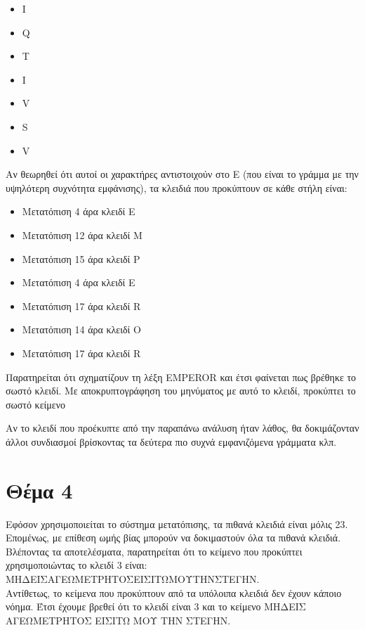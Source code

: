 \documentclass[a4paper, 11pt]{article}
\newcommand{\lt}{\latintext}
\begin{document}
{\lt
\begin{itemize}
	\item I
	\item Q
	\item T
	\item I
	\item V
	\item S
	\item V
\end{itemize}
}

Αν θεωρηθεί ότι αυτοί οι χαρακτήρες αντιστοιχούν στο {\lt E} (που είναι το γράμμα με την υψηλότερη συχνότητα εμφάνισης), τα
κλειδιά που προκύπτουν σε κάθε στήλη είναι:

\begin{itemize}
	\item Μετατόπιση 4 άρα κλειδί {\lt E}
	\item Μετατόπιση 12 άρα κλειδί {\lt M}
	\item Μετατόπιση 15 άρα κλειδί {\lt P}
	\item Μετατόπιση 4 άρα κλειδί {\lt E}
	\item Μετατόπιση 17 άρα κλειδί {\lt R}
	\item Μετατόπιση 14 άρα κλειδί {\lt O}
	\item Μετατόπιση 17 άρα κλειδί {\lt R}
\end{itemize}

Παρατηρείται ότι σχηματίζουν τη λέξη {\lt EMPEROR} και έτσι φαίνεται πως βρέθηκε το σωστό κλειδί. Με αποκρυπτογράφηση του
μηνύματος με αυτό το κλειδί, προκύπτει το σωστό κείμενο

Αν το κλειδί που προέκυπτε από την παραπάνω ανάλυση ήταν λάθος, θα δοκιμάζονταν άλλοι συνδιασμοί βρίσκοντας τα δεύτερα πιο συχνά εμφανιζόμενα γράμματα κλπ.




\newpage


\section*{Θέμα 4}
Εφόσον χρησιμοποιείται το σύστημα μετατόπισης, τα πιθανά κλειδιά είναι μόλις 23. Επομένως, με επίθεση ωμής βίας μπορούν να
δοκιμαστούν όλα τα πιθανά κλειδιά. Βλέποντας τα αποτελέσματα, παρατηρείται ότι το κείμενο που προκύπτει χρησιμοποιώντας το κλειδί 3 είναι:\\
ΜΗΔΕΙΣΑΓΕΩΜΕΤΡΗΤΟΣΕΙΣΙΤΩΜΟΥΤΗΝΣΤΕΓΗΝ.\\
Αντίθετως, το κείμενα που προκύπτουν από τα υπόλοιπα κλειδιά δεν έχουν κάποιο νόημα. Έτσι έχουμε βρεθεί ότι
το κλειδί είναι 3 και το κείμενο ΜΗΔΕΙΣ ΑΓΕΩΜΕΤΡΗΤΟΣ ΕΙΣΙΤΩ ΜΟΥ ΤΗΝ ΣΤΕΓΗΝ.
\end{document}
